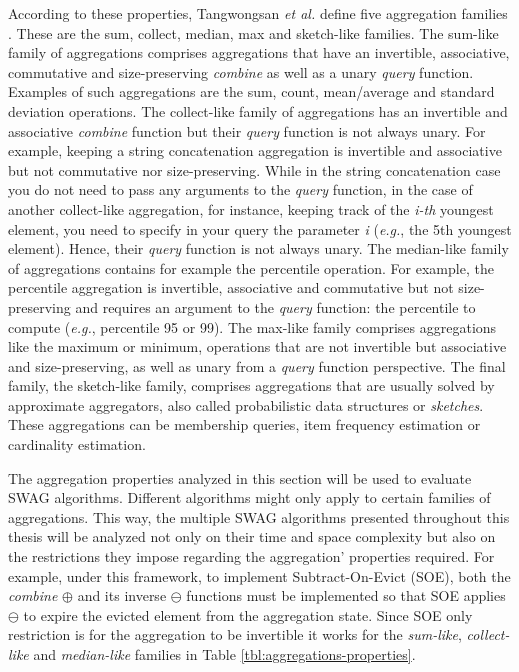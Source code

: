 According to these properties, Tangwongsan \emph{et al.} define five aggregation families \cite{Tangwongsan-Sliding-Window-Aggregation-Algorithms}. These are the sum, collect, median, max and sketch-like families. The sum-like family of aggregations comprises aggregations that have an invertible, associative, commutative and size-preserving \textit{combine} as well as a unary \textit{query} function. Examples of such aggregations are the sum, count, mean/average and standard deviation operations. The collect-like family of aggregations has an invertible and associative \textit{combine} function but their \textit{query} function is not always unary. For example, keeping a string concatenation aggregation is invertible and associative but not commutative nor size-preserving. While in the string concatenation case you do not need to pass any arguments to the \textit{query} function, in the case of another collect-like aggregation, for instance, keeping track of the \textit{i-th} youngest element, you need to specify in your query the parameter \textit{i} (\textit{e.g.}, the 5th youngest element). Hence, their \textit{query} function is not always unary. The median-like family of aggregations contains for example the percentile operation. For example, the percentile aggregation is invertible, associative and commutative but not size-preserving and requires an argument to the \textit{query} function: the percentile to compute (\textit{e.g.}, percentile 95 or 99). The max-like family comprises aggregations like the maximum or minimum, operations that are not invertible but associative and size-preserving, as well as unary from a \textit{query} function perspective. The final family, the sketch-like family, comprises aggregations that are usually solved by approximate aggregators, also called probabilistic data structures or \textit{sketches}. These aggregations can be membership queries, item frequency estimation or cardinality estimation.

The aggregation properties analyzed in this section will be used to evaluate SWAG algorithms. Different algorithms might only apply to certain families of aggregations. This way, the multiple SWAG algorithms presented throughout this thesis will be analyzed not only on their time and space complexity but also on the restrictions they impose regarding the aggregation' properties required. For example, under this framework, to implement Subtract-On-Evict (SOE), both the \textit{combine} $\oplus$ and its inverse $\ominus$ functions must be implemented so that SOE applies $\ominus$ to expire the evicted element from the aggregation state. Since SOE only restriction is for the aggregation to be invertible it works for the \textit{sum-like}, \textit{collect-like} and \textit{median-like} families in Table \ref{tbl:aggregations-properties}.

